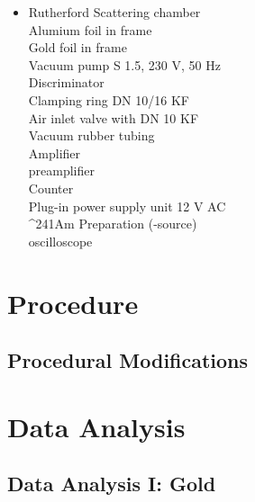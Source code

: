 \documentclass[a4paper]{article}
\begin{document}
\qq 

\begin{itemize}
\item 
Rutherford Scattering chamber \\
Alumium foil in frame  \\
Gold foil in frame \\
Vacuum pump S 1.5, 230 V, 50 Hz \\
Discriminator \\
Clamping ring DN 10/16 KF \\
Air inlet valve with DN 10 KF \\
Vacuum rubber tubing  \\
Amplifier \\
preamplifier \\
Counter  \\
Plug-in power supply unit 12 V AC  \\
^{241}Am Preparation (-source) \\
oscilloscope  \\
\end{itemize}

\begin{figure}[H]
\centering
\label{name}
\end{figure}

\section{Procedure}

\qq

\subsection{Procedural Modifications}

\qq 

\section{Data Analysis}

\subsection{Data Analysis I: Gold}
\end{document}
